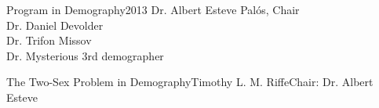 





 {Program in
Demography}{2013} {Dr. Albert Esteve Pal\'{o}s, Chair\\
 Dr. Daniel Devolder\\
 Dr. Trifon Missov\\
 Dr. Mysterious 3rd demographer}

\initializefrontsections



\makeatletter
\if@twoside \setcounter{page}{4} \else \setcounter{page}{1} \fi
\makeatother
 

\startacknowledgementspage

\label{Acknowledgements}

%

\tableofcontents      %
\listoffigures        %
\listoftables        %

\startabstractpage
{The Two-Sex Problem in Demography}{Timothy L. M. Riffe}{Chair: Dr. Albert Esteve}

\label{Abstract}

